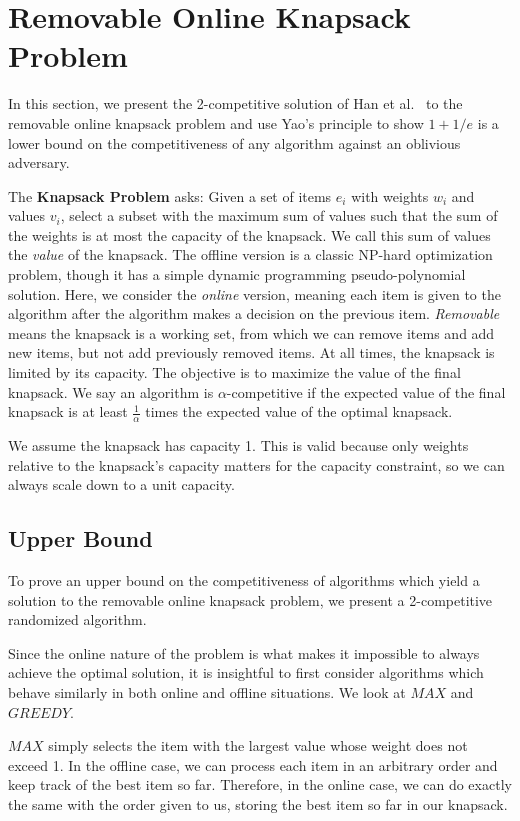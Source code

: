 \section{Removable Online Knapsack Problem}
In this section, we present the 2-competitive solution of Han et al.~\cite{han} to the removable online knapsack problem and use Yao's principle to show $1+1/e$ is a lower bound on the competitiveness of any algorithm against an oblivious adversary.

The \textbf{Knapsack Problem} asks: Given a set of items $e_i$ with weights $w_i$ and values $v_i$, select a subset with the maximum sum of values such that the sum of the weights is at most the capacity of the knapsack. We call this sum of values the \emph{value} of the knapsack. The offline version is a classic NP-hard optimization problem, though it has a simple dynamic programming pseudo-polynomial solution. Here, we consider the \emph{online} version, meaning each item is given to the algorithm after the algorithm makes a decision on the previous item. \emph{Removable} means the knapsack is a working set, from which we can remove items and add new items, but not add previously removed items. At all times, the knapsack is limited by its capacity. The objective is to maximize the value of the final knapsack. We say an algorithm is $\alpha$-competitive if the expected value of the final knapsack is at least $\frac{1}{\alpha}$ times the expected value of the optimal knapsack.

We assume the knapsack has capacity 1. This is valid because only weights relative to the knapsack's capacity matters for the capacity constraint, so we can always scale down to a unit capacity.

\subsection{Upper Bound} %
To prove an upper bound on the competitiveness of algorithms which yield a solution to the removable online knapsack problem, we present a 2-competitive randomized algorithm.

Since the online nature of the problem is what makes it impossible to always achieve the optimal solution, it is insightful to first consider algorithms which behave similarly in both online and offline situations. We look at $MAX$ and $GREEDY$.

$MAX$ simply selects the item with the largest value whose weight does not exceed 1. In the offline case, we can process each item in an arbitrary order and keep track of the best item so far. Therefore, in the online case, we can do exactly the same with the order given to us, storing the best item so far in our knapsack.

